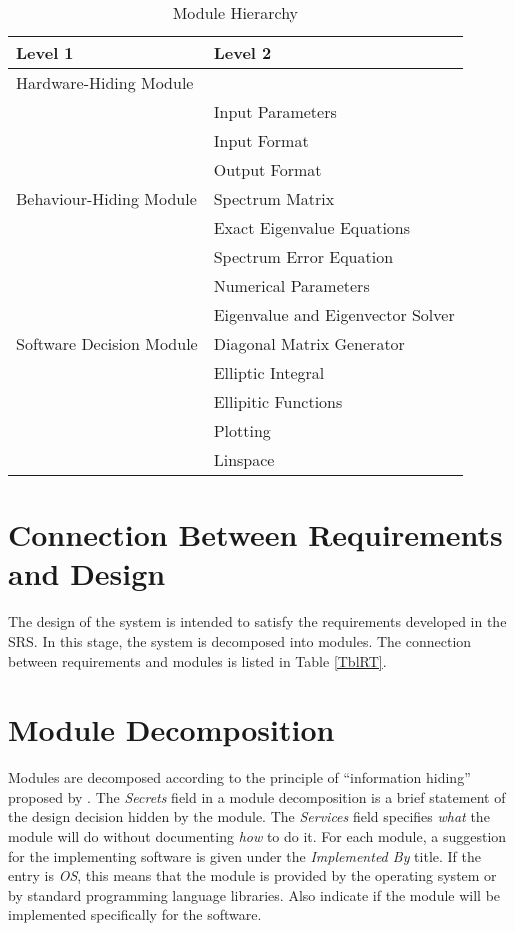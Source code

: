 \documentclass[12pt, titlepage]{article}
\begin{document}
\begin{table}[h]
\centering
\begin{tabular}{p{} p{}}
\toprule
\textbf{Level 1} & \textbf{Level 2}\\
\midrule

{Hardware-Hiding Module} & ~ \\
\midrule

\multirow{7}{0.3\textwidth}{Behaviour-Hiding Module} 
& Input Parameters \\
& Input Format \\
& Output Format \\
& Spectrum Matrix \\
& Exact Eigenvalue Equations \\
& Spectrum Error Equation \\
& Numerical Parameters \\ 
\midrule

\multirow{3}{0.3\textwidth}{Software Decision Module} 
& Eigenvalue and Eigenvector Solver \\
& Diagonal Matrix Generator\\
& Elliptic Integral\\ 
& Ellipitic Functions\\ 
& Plotting \\ 
& Linspace \\
\bottomrule

\end{tabular}
\caption{Module Hierarchy}
\label{TblMH}
\end{table}

\newpage 
\section{Connection Between Requirements and Design} \label{SecConnection}

The design of the system is intended to satisfy the requirements developed in
the SRS. In this stage, the system is decomposed into modules. The connection
between requirements and modules is listed in Table \ref{TblRT}.

\section{Module Decomposition} \label{SecMD}

Modules are decomposed according to the principle of ``information hiding''
proposed by \citet{ParnasEtAl1984}. The \emph{Secrets} field in a module
decomposition is a brief statement of the design decision hidden by the
module. The \emph{Services} field specifies \emph{what} the module will do
without documenting \emph{how} to do it. For each module, a suggestion for the
implementing software is given under the \emph{Implemented By} title. If the
entry is \emph{OS}, this means that the module is provided by the operating
system or by standard programming language libraries.  Also indicate if the
module will be implemented specifically for the software.
\end{document}

